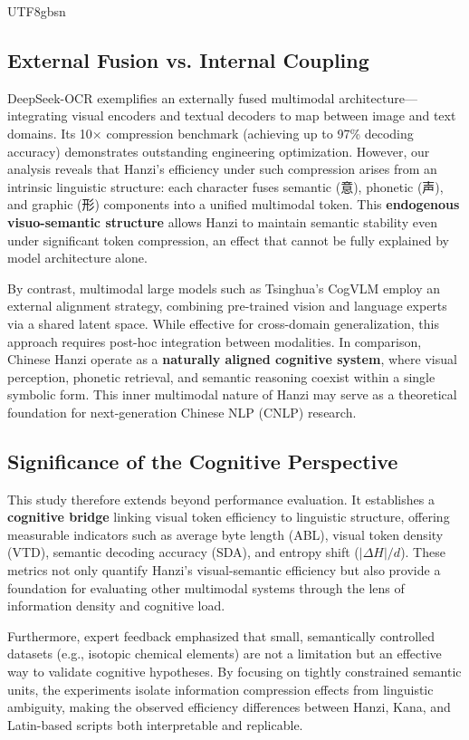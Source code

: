 \documentclass[conference]{IEEEtran}
\begin{document}
\begin{CJK*}{UTF8}{gbsn}
\subsection{External Fusion vs. Internal Coupling}

DeepSeek-OCR exemplifies an externally fused multimodal architecture—integrating visual encoders and textual decoders to map between image and text domains. Its 10× compression benchmark (achieving up to 97\% decoding accuracy) demonstrates outstanding engineering optimization. However, our analysis reveals that Hanzi’s efficiency under such compression arises from an intrinsic linguistic structure: each character fuses semantic (意), phonetic (声), and graphic (形) components into a unified multimodal token. This \textbf{endogenous visuo-semantic structure} allows Hanzi to maintain semantic stability even under significant token compression, an effect that cannot be fully explained by model architecture alone.

By contrast, multimodal large models such as Tsinghua’s CogVLM employ an external alignment strategy, combining pre-trained vision and language experts via a shared latent space. While effective for cross-domain generalization, this approach requires post-hoc integration between modalities. In comparison, Chinese Hanzi operate as a \textbf{naturally aligned cognitive system}, where visual perception, phonetic retrieval, and semantic reasoning coexist within a single symbolic form. This inner multimodal nature of Hanzi may serve as a theoretical foundation for next-generation Chinese NLP (CNLP) research.

\subsection{Significance of the Cognitive Perspective}

This study therefore extends beyond performance evaluation. It establishes a \textbf{cognitive bridge} linking visual token efficiency to linguistic structure, offering measurable indicators such as average byte length (ABL), visual token density (VTD), semantic decoding accuracy (SDA), and entropy shift ($|\Delta H|/d$). These metrics not only quantify Hanzi’s visual-semantic efficiency but also provide a foundation for evaluating other multimodal systems through the lens of information density and cognitive load.

Furthermore, expert feedback emphasized that small, semantically controlled datasets (e.g., isotopic chemical elements) are not a limitation but an effective way to validate cognitive hypotheses. By focusing on tightly constrained semantic units, the experiments isolate information compression effects from linguistic ambiguity, making the observed efficiency differences between Hanzi, Kana, and Latin-based scripts both interpretable and replicable.


\end{CJK*}
\end{document}
